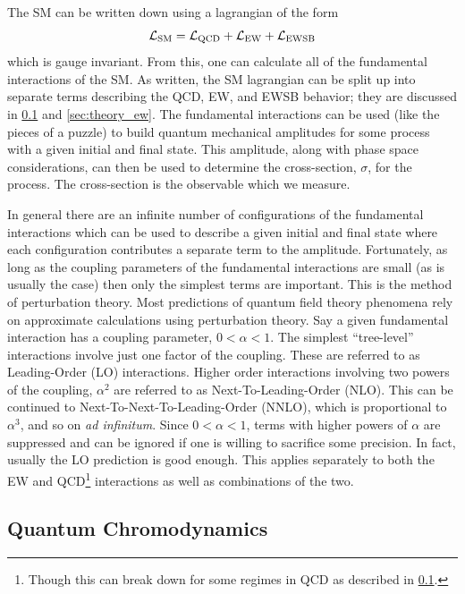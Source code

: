 The SM can be written down using a lagrangian of the form
\begin{equation}
\mathcal{L}_{\textrm{SM}} = \mathcal{L}_{\textrm{QCD}} + \mathcal{L}_{\textrm{EW}} + \mathcal{L}_{\textrm{EWSB}}
\label{eq:lagrangian_sm}
\end{equation}
which is gauge invariant.
From this, one can calculate all of the fundamental interactions of the SM.
As written, the SM lagrangian can be split up into separate terms describing the
QCD, EW, and EWSB behavior; they are discussed in \sec\ref{sec:theory_qcd} and
\sec\ref{sec:theory_ew}.
The fundamental interactions can be used (like the pieces of a puzzle)
to build quantum mechanical amplitudes for some process 
with a given initial and final state. 
This amplitude, along with phase space considerations, can then be used
to determine the cross-section, $\sigma$, for the process. The cross-section
is the observable which we measure.


In general there are an infinite number of configurations of the fundamental
interactions which can be used to describe a given initial and final state where
each configuration contributes a separate term to the amplitude. 
Fortunately,
as long as the coupling parameters of the fundamental interactions are small
(as is usually the case) then only the simplest terms are important.
This is the method of perturbation theory.  
Most predictions of quantum field theory phenomena rely on approximate calculations
using perturbation theory. Say a given fundamental interaction has a coupling 
parameter, $0 < \alpha < 1$. The simplest ``tree-level'' interactions
involve just one factor of the coupling. 
These are referred to as 
Leading-Order (LO) interactions.
Higher order interactions 
involving two powers of the coupling, 
$\alpha^2$ are referred to as Next-To-Leading-Order (NLO).
This can be continued to Next-To-Next-To-Leading-Order (NNLO), which is 
proportional to $\alpha^3$, and so on \emph{ad infinitum}.
Since $0 < \alpha < 1$, terms with higher powers of $\alpha$ are suppressed
and can be ignored if one is willing to sacrifice some precision. In fact,
usually the LO prediction is good enough. This applies separately to 
both the EW and QCD\footnote{Though this can break down for some
regimes in QCD as described in \sec\ref{sec:theory_qcd}.}
interactions as well as combinations of the two. 



\subsection{Quantum Chromodynamics}
\label{sec:theory_qcd}

